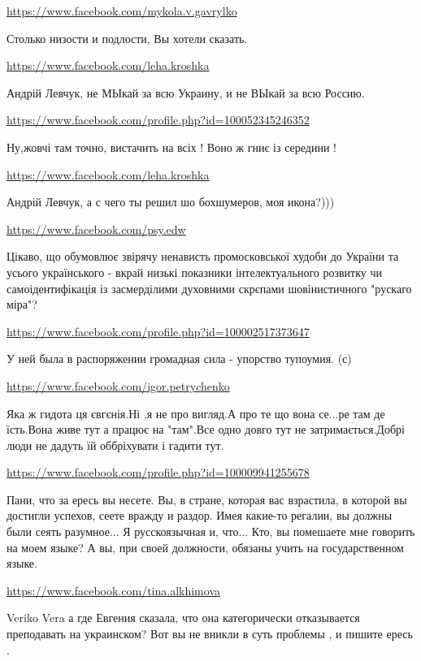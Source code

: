 \documentclass[a4paper,11pt]{extreport}
\begin{document}
\begin{itemize}
\begin{itemize}
\url{https://www.facebook.com/mykola.v.gavrylko}

Столько низости и подлости, Вы хотели сказать.

\url{https://www.facebook.com/leha.kroshka}

Андрій Левчук, не МЫкай за всю Украину, и не ВЫкай за всю Россию.

\url{https://www.facebook.com/profile.php?id=100052345246352}

Ну,жовчі там точно, вистачить на всіх ! Воно ж гниє із середини !

\url{https://www.facebook.com/leha.kroshka}

Андрій Левчук, а с чего ты решил шо бохшумеров, моя икона?)))

\end{itemize}
\url{https://www.facebook.com/psy.edw}

Цікаво, що обумовлює звірячу ненависть промосковської худоби до України та усього українського - вкрай низькі показники інтелектуального розвитку чи самоідентифікація із засмерділими духовними скрєпами шовінистичного "рускаго міра"?

\url{https://www.facebook.com/profile.php?id=100002517373647}

У ней была в распоряжении громадная сила - упорство тупоумия. (с)

\url{https://www.facebook.com/igor.petrychenko}

Яка ж гидота ця євгєнія.Ні ,я не про вигляд.А про те що вона се...ре там де їсть.Вона живе тут а працює на "там".Все одно довго тут не затримається.Добрі люди не дадуть їй оббріхувати і гадити тут.

\url{https://www.facebook.com/profile.php?id=100009941255678}

Пани, что за ересь вы несете. Вы, в стране, которая вас взрастила, в которой вы достигли успехов, сеете вражду и раздор. Имея какие-то регалии, вы должны были сеять разумное... Я русскоязычная и, что... Кто, вы помешаете мне говорить на моем языке? А вы, при своей должности, обязаны учить на государственном языке.

\begin{itemize}
\url{https://www.facebook.com/tina.alkhimova}

Veriko Vera а где Евгения сказала, что она категорически отказывается преподавать на украинском? Вот вы не вникли в суть проблемы , и пишите ересь .


\end{itemize}
\end{itemize}
\end{document}
